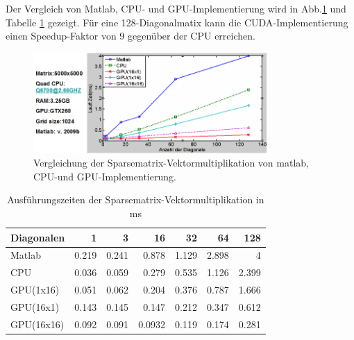 


Der Vergleich von Matlab, CPU- und GPU-Implementierung wird in
Abb.\ref{sparse_ergebnis} und Tabelle \ref{tab_sparse_result} gezeigt.
Für eine 128-Diagonalmatix kann die CUDA-Implementierung
einen Speedup-Faktor von 9 gegenüber der  CPU erreichen.


\begin{figure}[htbp]
\includegraphics[width=3.5in]{../xby/pic//sparse_ergebnis}
\caption{Vergleichung der Sparsematrix-Vektormultiplikation von matlab, CPU-und GPU-Implementierung.}
\label{sparse_ergebnis}
\end{figure}


\begin{table}
\renewcommand{\arraystretch}{1.3}
\caption{Ausführungszeiten der Sparsematrix-Vektormultiplikation in ms}
\label{tab_sparse_result}
\centering
\begin{tabular}{|l|r|r|r|r|r|r|}

\hline
Diagonalen& 1& 3& 16& 32& 64 &128\\


\hline
\hline
Matlab     &   0.219   &   0.241&   0.878  &  1.129 &  2.898  & 4\\
CPU        & 	0.036 &   0.059& 	0.279  &  0.535 &  1.126  & 2.399 \\
GPU(1x16)  & 0.051     &   0.062 &  0.204  &  0.376 &  0.787  & 1.666\\
GPU(16x1)  & 0.143     &	0.145 &	0.147  &  0.212 &	0.347 &	0.612\\

GPU(16x16)     & 0.092 &	0.091  &	0.0932 &	0.119&	0.174 &	0.281\\

\hline
\end{tabular}
\end{table}